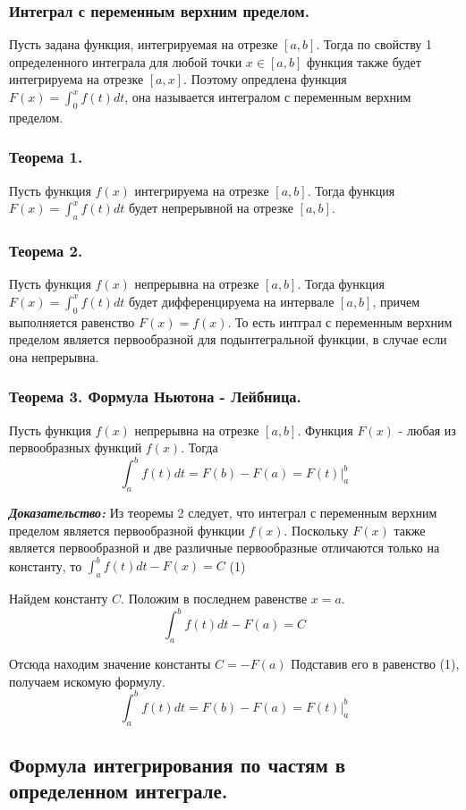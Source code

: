\documentclass[a4paper,12pt]{article}
\theoremstyle{plain} %
\theoremstyle{definition} %
\theoremstyle{remark} %
\begin{document}
\subsubsection*{Интеграл с переменным верхним пределом.}

Пусть задана функция, интегрируемая на отрезке $[a, b]$. Тогда по свойству 1 определенного интеграла для любой точки $x \in [a, b]$ функция также будет интегрируема на отрезке $[a, x]$. Поэтому опредлена функция $F(x) = \int_0^x f(t)dt$, она называется интегралом с переменным верхним пределом.

\subsubsection*{Теорема 1.}
Пусть функция $f(x)$ интегрируема на отрезке $[a, b]$. Тогда функция $F(x) = \int_a^x f(t) dt$ будет непрерывной на отрезке $[a, b]$.

\subsubsection*{Теорема 2.}
Пусть функция $f(x)$ непрерывна на отрезке $[a, b]$. Тогда функция $F(x) = \int_0^x f(t) dt$ будет дифференцируема на интервале $[a, b]$, причем выполняется равенство $F(x) = f(x)$. То есть интграл с переменным верхним пределом является первообразной для подынтегральной функции, в случае если она непрерывна.

\subsubsection*{Теорема 3. Формула Ньютона - Лейбница.}
Пусть функция $f(x)$ непрерывна на отрезке $[a, b]$. Функция $F(x)$ - любая из первообразных функций $f(x)$. Тогда
\[
	\int_a^b f(t) dt = F(b) - F(a) = F(t) \Big|_a^b
\]

\textit{\textbf{Доказательство:}}
Из теоремы 2 следует, что интеграл с переменным верхним пределом является первообразной функции $f(x)$. Поскольку $F(x)$ также является первообразной и две различные первообразные отличаются только на константу, то $\int_a^b f(t) dt - F(x) = C$ (1)

Найдем константу $C$. Положим в последнем равенстве $x = a$.
\[
	\int_a^b f(t) dt - F(a) = C
\]

Отсюда находим значение константы $C = - F(a)$
Подставив его в равенство (1), получаем искомую формулу.
\[
	\int_a^b f(t) dt = F(b) - F(a) = F(t) \Big|_a^b
\]


\newpage
\subsection*{Формула интегрирования по частям в определенном интеграле.                                   }
\end{document}
